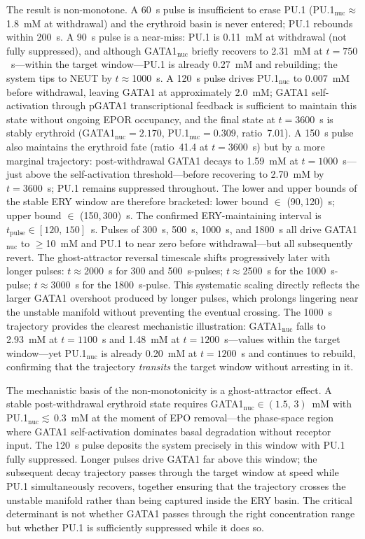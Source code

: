 The result is non-monotone. A 60~s pulse is insufficient to erase PU.1 (PU.1$_\text{nuc}\approx$1.8~mM at withdrawal) and the erythroid basin is never entered; PU.1 rebounds within 200~s. A 90~s pulse is a near-miss: PU.1 is 0.11~mM at withdrawal (not fully suppressed), and although GATA1$_\text{nuc}$ briefly recovers to 2.31~mM at $t=750$~s---within the target window---PU.1 is already 0.27~mM and rebuilding; the system tips to NEUT by $t\approx$1000~s. A 120~s pulse drives PU.1$_\text{nuc}$ to 0.007~mM before withdrawal, leaving GATA1 at approximately 2.0~mM; GATA1 self-activation through pGATA1 transcriptional feedback is sufficient to maintain this state without ongoing EPOR occupancy, and the final state at $t=3600$~s is stably erythroid (GATA1$_\text{nuc}=2.170$, PU.1$_\text{nuc}=0.309$, ratio~7.01). A 150~s pulse also maintains the erythroid fate (ratio~41.4 at $t=3600$~s) but by a more marginal trajectory: post-withdrawal GATA1 decays to 1.59~mM at $t=1000$~s---just above the self-activation threshold---before recovering to 2.70~mM by $t=3600$~s; PU.1 remains suppressed throughout. The lower and upper bounds of the stable ERY window are therefore bracketed: lower bound $\in$ (90,\,120)~s; upper bound $\in$ (150,\,300)~s. The confirmed ERY-maintaining interval is $t_{\mathrm{pulse}} \in [120,\,150]$~s. Pulses of 300~s, 500~s, 1000~s, and 1800~s all drive GATA1$_\text{nuc}$ to $\geq$10~mM and PU.1 to near zero before withdrawal---but all subsequently revert. The ghost-attractor reversal timescale shifts progressively later with longer pulses: $t\approx$2000~s for 300 and 500~s-pulses; $t\approx$2500~s for the 1000~s-pulse; $t\approx$3000~s for the 1800~s-pulse. This systematic scaling directly reflects the larger GATA1 overshoot produced by longer pulses, which prolongs lingering near the unstable manifold without preventing the eventual crossing. The 1000~s trajectory provides the clearest mechanistic illustration: GATA1$_\text{nuc}$ falls to 2.93~mM at $t=1100$~s and 1.48~mM at $t=1200$~s---values within the target window---yet PU.1$_\text{nuc}$ is already 0.20~mM at $t=1200$~s and continues to rebuild, confirming that the trajectory \emph{transits} the target window without arresting in it.

The mechanistic basis of the non-monotonicity is a ghost-attractor effect. A stable post-withdrawal erythroid state requires GATA1$_\text{nuc}\in(1.5,\,3)$~mM with PU.1$_\text{nuc}\lesssim$\,0.3~mM at the moment of EPO removal---the phase-space region where GATA1 self-activation dominates basal degradation without receptor input. The 120~s pulse deposits the system precisely in this window with PU.1 fully suppressed. Longer pulses drive GATA1 far above this window; the subsequent decay trajectory passes through the target window at speed while PU.1 simultaneously recovers, together ensuring that the trajectory crosses the unstable manifold rather than being captured inside the ERY basin. The critical determinant is not whether GATA1 passes through the right concentration range but whether PU.1 is sufficiently suppressed while it does so.

